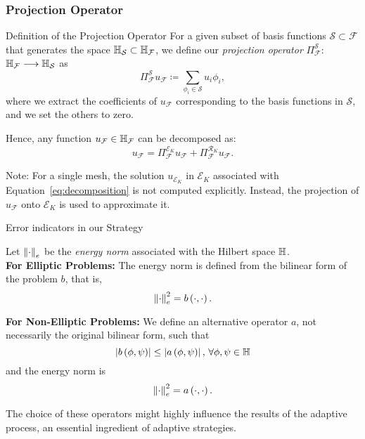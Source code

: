 \begin{frame}
\frametitle{Projection Operator}
    \begin{block}{Definition of the Projection Operator}
        For a given subset of basis functions $\mathcal{S} \subset \mathcal{F}$ that generates the space $\mathbb{H}_{\mathcal{S}} \subset \mathbb{H}_{\mathcal{F}}$, we define our \emph{projection operator} $\Pi_{\mathcal{F}}^{\mathcal{S}}$: $\mathbb{H} _{\mathcal{F}} \longrightarrow \mathbb{H}_{\mathcal{S}}$ as
        \begin{equation}
            \Pi_{\mathcal{F}}^{\mathcal{S}} u_{\mathcal{F}} \coloneqq \sum_{\phi_{i} \in \mathcal{S}} u_{i} \phi_{i},
        \end{equation}
        where we extract the coefficients of $u_{\mathcal{F}}$ corresponding to the basis functions in $\mathcal{S}$, and we set the others to zero.
    \end{block}
    Hence, any function $u_{\mathcal{F}} \in \mathbb{H}_{\mathcal{F}}$ can be decomposed as:
        \begin{equation}
            u_{\mathcal{F}} =  \Pi_{\mathcal{F}}^{\mathcal{E}_K} u_{\mathcal{F}} + \Pi_{\mathcal{F}}^{\mathcal{R}_K} u_{\mathcal{F}}.\label{eq:decomposition}
        \end{equation}

        Note: For a single mesh, the solution $u_{\mathcal{E}_K}$ in $\mathcal{E}_K$ associated with Equation~\eqref{eq:decomposition} is not computed explicitly. Instead, the projection of $u_{\mathcal{F}}$ onto $\mathcal{E}_K$ is used to approximate it.

\end{frame}

\begin{frame}{Error indicators in our Strategy}

Let $\left\|\cdot\right\|_e$ be the \emph{energy norm} associated with the Hilbert space $\mathbb{H}$. \\

\textbf{For Elliptic Problems:}
The energy norm is defined from the bilinear form of the problem $b$, that is, 
\[\left\|\cdot\right\|_e^2 = b\left(\cdot, \cdot\right).\]

\textbf{For Non-Elliptic Problems:}
We define an alternative operator $a$, not necessarily the original bilinear form, such that 
\[\left|b\left(\phi, \psi\right)\right| \leq \left|a\left(\phi, \psi\right)\right|, \, \forall \phi, \psi \in \mathbb{H}\]
and the energy norm is 
\[\left\|\cdot\right\|_e^2 = a\left(\cdot, \cdot\right).\]

The choice of these operators might highly influence the results of the adaptive process, an essential ingredient of adaptive strategies.

\end{frame}

